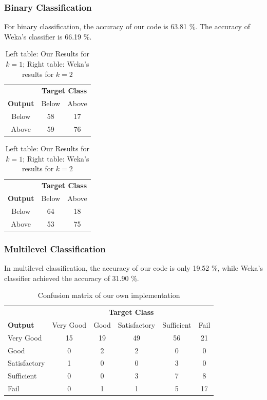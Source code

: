 \subsubsection{Binary Classification}
For binary classification, the accuracy of our code is 63.81 \%. The accuracy of Weka's classifier is 66.19 \%.
\begin{table}[h]
\begin{center}
  \begin{tabular}{c|cc}
  & \multicolumn{2}{c}{\textbf{Target Class}} \\
 \textbf{Output} & Below & Above\\ \hline
  Below & 58 & 17 \\
  Above & 59 & 76
\end{tabular}
\quad
\begin{tabular}{c|cc}
  & \multicolumn{2}{c}{\textbf{Target Class}} \\
 \textbf{Output} & Below & Above\\ \hline
  Below & 64 & 18 \\
  Above & 53 & 75
\end{tabular}
\caption{Left table: Our Results for $k = 1$; Right table: Weka's results for $k = 2$ }
\label{tab:kNNbin}
\end{center}
\end{table}

\subsubsection{Multilevel Classification}
In multilevel classification, the accuracy of our code is only 19.52 \%, while Weka's classifier achieved the accuracy of 31.90 \%.
\begin{table}[h]
  \begin{tabular}{l|ccccc}
     & \multicolumn{5}{c}{\textbf{Target Class}} \\ 
  \textbf{Output} & Very Good & Good & Satisfactory & Sufficient & Fail \\  \hline
  Very Good  & 15 & 19 & 49 & 56 & 21\\
     Good & 0 & 2 & 2 & 0 & 0\\
     Satisfactory & 1 & 0 & 0 & 3 & 0\\
     Sufficient & 0 & 0 & 3 & 7 & 8\\
     Fail & 0 & 1 & 1 & 5 & 17\\
  \end{tabular}
  \caption{Confusion matrix of our own implementation}
  \label{tab:kNNmultiOwn}
\end{table}

